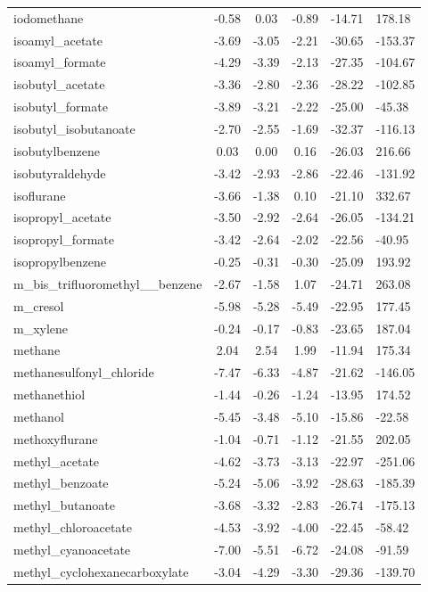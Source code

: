 \documentclass{amsart}
\begin{document}
\begin{longtable}{L|C|C|C|X|X}
iodomethane & -0.58 & 0.03 & -0.89 & -14.71 & 178.18 \\ 
isoamyl\_acetate & -3.69 & -3.05 & -2.21 & -30.65 & -153.37 \\ 
isoamyl\_formate & -4.29 & -3.39 & -2.13 & -27.35 & -104.67 \\ 
isobutyl\_acetate & -3.36 & -2.80 & -2.36 & -28.22 & -102.85 \\ 
isobutyl\_formate & -3.89 & -3.21 & -2.22 & -25.00 & -45.38 \\ 
isobutyl\_isobutanoate & -2.70 & -2.55 & -1.69 & -32.37 & -116.13 \\ 
isobutylbenzene & 0.03 & 0.00 & 0.16 & -26.03 & 216.66 \\ 
isobutyraldehyde & -3.42 & -2.93 & -2.86 & -22.46 & -131.92 \\ 
isoflurane & -3.66 & -1.38 & 0.10 & -21.10 & 332.67 \\ 
isopropyl\_acetate & -3.50 & -2.92 & -2.64 & -26.05 & -134.21 \\ 
isopropyl\_formate & -3.42 & -2.64 & -2.02 & -22.56 & -40.95 \\ 
isopropylbenzene & -0.25 & -0.31 & -0.30 & -25.09 & 193.92 \\ 
m\_bis\_trifluoromethyl\_\_benzene & -2.67 & -1.58 & 1.07 & -24.71 & 263.08 \\ 
m\_cresol & -5.98 & -5.28 & -5.49 & -22.95 & 177.45 \\ 
m\_xylene & -0.24 & -0.17 & -0.83 & -23.65 & 187.04 \\ 
methane & 2.04 & 2.54 & 1.99 & -11.94 & 175.34 \\ 
methanesulfonyl\_chloride & -7.47 & -6.33 & -4.87 & -21.62 & -146.05 \\ 
methanethiol & -1.44 & -0.26 & -1.24 & -13.95 & 174.52 \\ 
methanol & -5.45 & -3.48 & -5.10 & -15.86 & -22.58 \\ 
methoxyflurane & -1.04 & -0.71 & -1.12 & -21.55 & 202.05 \\ 
methyl\_acetate & -4.62 & -3.73 & -3.13 & -22.97 & -251.06 \\ 
methyl\_benzoate & -5.24 & -5.06 & -3.92 & -28.63 & -185.39 \\ 
methyl\_butanoate & -3.68 & -3.32 & -2.83 & -26.74 & -175.13 \\ 
methyl\_chloroacetate & -4.53 & -3.92 & -4.00 & -22.45 & -58.42 \\ 
methyl\_cyanoacetate & -7.00 & -5.51 & -6.72 & -24.08 & -91.59 \\ 
methyl\_cyclohexanecarboxylate & -3.04 & -4.29 & -3.30 & -29.36 & -139.70 \\ 

\end{longtable}
\end{document}
